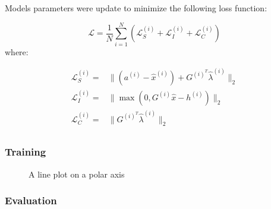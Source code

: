 \documentclass[
]{article}
\begin{document}
Models parameters were update to minimize the following loss function:

\[
\mathcal{L} = \frac{1}{N}\sum_{i=1}^N(\mathcal{L}_S^{(i)} + \mathcal{L}_{I}^{(i)}  + \mathcal{L}_{C}^{(i)})
\] where:

\begin{align}
    \mathcal{L}_S^{(i)} =& \|(a^{(i)}-\hat{x}^{(i)}) + G^{(i)^{T}}\hat\lambda^{(i)}\|_2\\ 
    \mathcal{L}_{I}^{(i)}  =& \|\max(0, G^{(i)}\hat{x} - h^{(i)})\|_2\\
    \mathcal{L}_{C}^{(i)}  =& \|G^{(i)^{T}}\hat\lambda^{(i)}\|_2\\
\end{align}

\subsubsection{Training}\label{training}

\begin{figure}


\caption{\label{fig-polar}A line plot on a polar axis}

\end{figure}%

\subsubsection{Evaluation}\label{evaluation}
\end{document}
